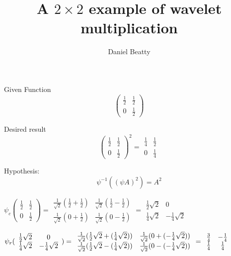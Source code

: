 \documentclass[11pt]{article}
\title{A $2 \times 2$ example of wavelet multiplication}
\author{Daniel Beatty}
\begin{document}
\maketitle


Given Function 
\[(
\begin{array}{cc}
\frac{1}{2} & \frac{1}{2} \\ 
0 & \frac{1}{2}
\end{array}
) \]

Desired result
\[(
\begin{array}{cc}
\frac{1}{2} & \frac{1}{2} \\ 
0 & \frac{1}{2}
\end{array}
)^{2}=\allowbreak 
\begin{array}{cc}
\frac{1}{4} & \frac{1}{2} \\ 
0 & \frac{1}{4}
\end{array}
\]

Hypothesis:  
\[ \psi^{-1} ((\psi{A})^2) = A^2 \]

$\psi _{c}(
\begin{array}{cc}
\frac{1}{2} & \frac{1}{2} \\ 
0 & \frac{1}{2}
\end{array}
)=
\begin{array}{cc}
\frac{1}{\sqrt{2}}\left( \frac{1}{2}+\frac{1}{2}\right)  & \frac{1}{\sqrt{2}}%
\left( \frac{1}{2}-\frac{1}{2}\right)  \\ 
\frac{1}{\sqrt{2}}(0+\frac{1}{2}) & \frac{1}{\sqrt{2}}(0-\frac{1}{2})
\end{array}
=\allowbreak 
\begin{array}{cc}
\frac{1}{2}\sqrt{2} & 0 \\ 
\frac{1}{4}\sqrt{2} & -\frac{1}{4}\sqrt{2}
\end{array}
$

$\psi _{r}(
\begin{array}{cc}
\frac{1}{2}\sqrt{2} & 0 \\ 
\frac{1}{4}\sqrt{2} & -\frac{1}{4}\sqrt{2}
\end{array}
)=
\begin{array}{cc}
\frac{1}{\sqrt{2}}(\frac{1}{2}\sqrt{2}+(\frac{1}{4}\sqrt{2})) & \frac{1}{%
\sqrt{2}}(0+(-\frac{1}{4}\sqrt{2})) \\ 
\frac{1}{\sqrt{2}}(\frac{1}{2}\sqrt{2}-(\frac{1}{4}\sqrt{2})) & \frac{1}{%
\sqrt{2}}(0-(-\frac{1}{4}\sqrt{2}))
\end{array}
=\allowbreak 
\begin{array}{cc}
\frac{3}{4} & -\frac{1}{4} \\ 
\frac{1}{4} & \frac{1}{4}
\end{array}
$
\end{document}
